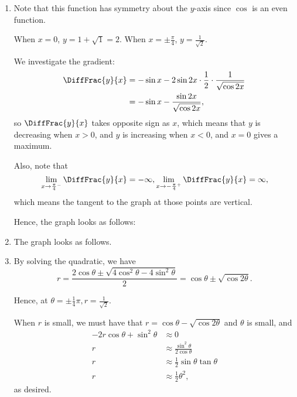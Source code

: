 \Question{\currfilebase}

\begin{enumerate}
    \item Note that this function has symmetry about the \(y\)-axis since \(\cos\) is an even function.

          When \(x = 0\), \(y = 1 + \sqrt{1} = 2\). When \(x = \pm \frac{\pi}{4}\), \(y = \frac{1}{\sqrt{2}}\).

          We investigate the gradient:
          \begin{align*}
              \DiffFrac{y}{x} & = - \sin x - 2 \sin 2x \cdot \frac{1}{2} \cdot \frac{1}{\sqrt{\cos 2x}} \\
                              & = - \sin x - \frac{\sin 2x}{\sqrt{\cos 2x}},
          \end{align*}
          so \(\DiffFrac{y}{x}\) takes opposite sign as \(x\), which means that \(y\) is decreasing when \(x > 0\), and \(y\) is increasing when \(x < 0\), and \(x = 0\) gives a maximum.

          Also, note that
          \[
              \lim_{x \to \frac{\pi}{4}^{-}} \DiffFrac{y}{x} = -\infty, \lim_{x \to -\frac{\pi}{4}^{+}} \DiffFrac{y}{x} = \infty,
          \]
          which means the tangent to the graph at those points are vertical.

          Hence, the graph looks as follows:
          \begin{center}
              
          \end{center}

    \item The graph looks as follows.
          \begin{center}
              
          \end{center}

    \item By solving the quadratic, we have
          \[
              r = \frac{2\cos \theta \pm \sqrt{4 \cos^2 \theta - 4 \sin^2 \theta}}{2} = \cos \theta \pm \sqrt{\cos 2 \theta}.
          \]

          Hence, at \(\theta = \pm \frac{1}{4}\pi, r = \frac{1}{\sqrt{2}}\).

          When \(r\) is small, we must have that \(r = \cos \theta - \sqrt{\cos 2 \theta}\) and \(\theta\) is small, and
          \begin{align*}
              -2r \cos \theta + \sin^2 \theta & \approx 0                                   \\
              r                               & \approx \frac{\sin^2 \theta}{2 \cos \theta} \\
              r                               & \approx \frac{1}{2} \sin \theta \tan \theta \\
              r                               & \approx \frac{1}{2} \theta^2,
          \end{align*}
          as desired.


\end{enumerate}
